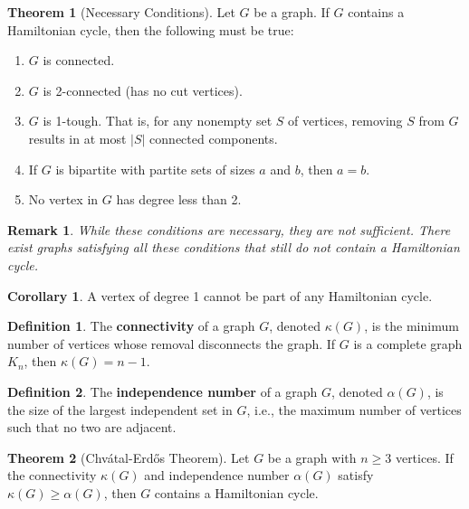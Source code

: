 \documentclass{article}
\newtheorem{remark}{Remark}
\theoremstyle{definition}
\newtheorem{theorem}{Theorem}
\newtheorem{corollary}{Corollary}
\newtheorem{definition}{Definition}
\begin{document}
\begin{theorem}[Necessary Conditions]
Let $G$ be a graph. If $G$ contains a Hamiltonian cycle, then the following must be true:
\begin{enumerate}
    \item $G$ is connected.
    \item $G$ is 2-connected (has no cut vertices).
    \item $G$ is 1-tough. That is, for any nonempty set $S$ of vertices, removing $S$ from $G$ results in at most $|S|$ connected components.
    \item If $G$ is bipartite with partite sets of sizes $a$ and $b$, then $a = b$.
    \item No vertex in $G$ has degree less than 2.
\end{enumerate}
\end{theorem}

\begin{remark}
While these conditions are necessary, they are not sufficient. There exist graphs satisfying all these conditions that still do not contain a Hamiltonian cycle.
\end{remark}


\begin{corollary}
A vertex of degree 1 cannot be part of any Hamiltonian cycle.
\end{corollary}

\begin{definition}
The \textbf{connectivity} of a graph $G$, denoted $\kappa(G)$, is the minimum number of vertices whose removal disconnects the graph. If $G$ is a complete graph $K_n$, then $\kappa(G) = n-1$.
\end{definition}

\begin{definition}
The \textbf{independence number} of a graph $G$, denoted $\alpha(G)$, is the size of the largest independent set in $G$, i.e., the maximum number of vertices such that no two are adjacent.
\end{definition}

\begin{theorem}[Chvátal-Erdős Theorem]
Let $G$ be a graph with $n \geq 3$ vertices. If the connectivity $\kappa(G)$ and independence number $\alpha(G)$ satisfy $\kappa(G) \geq \alpha(G)$, then $G$ contains a Hamiltonian cycle.
\end{theorem}
\end{document}
